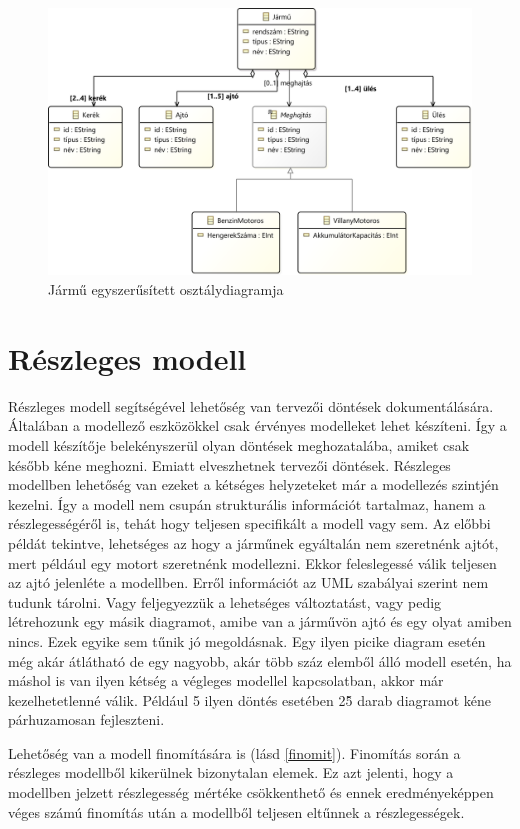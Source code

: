 \begin{figure}[!ht]
	\centering
	\includegraphics[width=130mm]{figures/vehicle.pdf}
	\caption{Jármű egyszerűsített osztálydiagramja} 
	\label{jarmu}
\end{figure}

\section{Részleges modell}
Részleges modell segítségével lehetőség van tervezői döntések dokumentálására. Általában a modellező eszközökkel csak érvényes modelleket lehet készíteni. Így a modell készítője belekényszerül olyan döntések meghozatalába, amiket csak később kéne meghozni. Emiatt elveszhetnek tervezői döntések. Részleges modellben lehetőség van ezeket a kétséges helyzeteket már a modellezés szintjén kezelni. Így a modell nem csupán strukturális információt tartalmaz, hanem a részlegességéről is, tehát hogy teljesen specifikált a modell vagy sem. Az előbbi példát tekintve, lehetséges az hogy a járműnek egyáltalán nem szeretnénk ajtót, mert például egy motort szeretnénk modellezni. Ekkor feleslegessé válik teljesen az ajtó jelenléte a modellben. Erről információt az UML szabályai szerint nem tudunk tárolni. Vagy feljegyezzük a lehetséges változtatást, vagy pedig létrehozunk egy másik diagramot, amibe van a járművön ajtó és egy olyat amiben nincs. Ezek egyike sem tűnik jó megoldásnak. Egy ilyen picike diagram esetén még akár átlátható de egy nagyobb, akár több száz elemből álló modell esetén, ha máshol is van ilyen kétség a végleges modellel kapcsolatban, akkor már kezelhetetlenné válik. Például 5 ilyen döntés esetében 2\^5 darab diagramot kéne párhuzamosan fejleszteni.
\par
Lehetőség van a modell finomítására is (lásd \autoref{finomit}). Finomítás során a részleges modellből kikerülnek bizonytalan elemek. Ez azt jelenti, hogy a modellben jelzett részlegesség mértéke csökkenthető és ennek eredményeképpen véges számú finomítás után a modellből teljesen eltűnnek a részlegességek.

